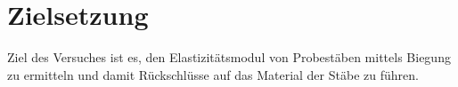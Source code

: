 \section{Zielsetzung}
Ziel des Versuches ist es, den Elastizitätsmodul von Probestäben mittels Biegung zu ermitteln und damit Rückschlüsse auf das Material der Stäbe zu führen.
